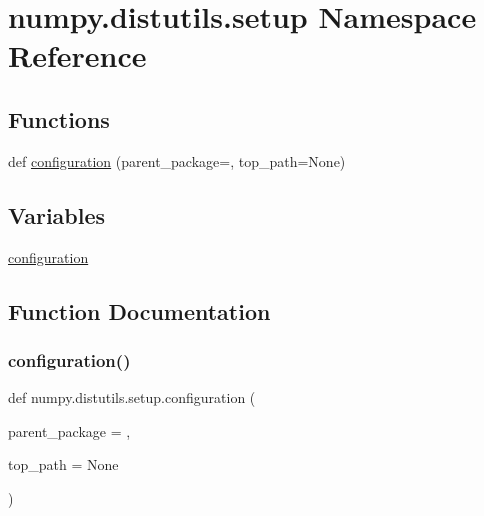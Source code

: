 \hypertarget{namespacenumpy_1_1distutils_1_1setup}{}\section{numpy.\+distutils.\+setup Namespace Reference}
\label{namespacenumpy_1_1distutils_1_1setup}
\subsection*{Functions}
\begin{DoxyCompactItemize}
\item 
def \hyperlink{namespacenumpy_1_1distutils_1_1setup_af956dab7787adcc67a082876d6aa20cd}{configuration} (parent\+\_\+package=\textquotesingle{}\textquotesingle{}, top\+\_\+path=None)
\end{DoxyCompactItemize}
\subsection*{Variables}
\begin{DoxyCompactItemize}
\item 
\hyperlink{namespacenumpy_1_1distutils_1_1setup_a3799a92b0117a6a90ad7345d3c3aff07}{configuration}
\end{DoxyCompactItemize}


\subsection{Function Documentation}
\mbox{\label{namespacenumpy_1_1distutils_1_1setup_af956dab7787adcc67a082876d6aa20cd}} 
\subsubsection{\texorpdfstring{configuration()}{configuration()}}
{\footnotesize\ttfamily def numpy.\+distutils.\+setup.\+configuration (\begin{DoxyParamCaption}\item[{}]{parent\+\_\+package = {\ttfamily \textquotesingle{}\textquotesingle{}},  }\item[{}]{top\+\_\+path = {\ttfamily None} }\end{DoxyParamCaption})}



